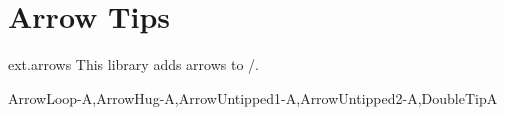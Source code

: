 %
%
%

\section{Arrow Tips}
\label{pgflibrary:arrows}
\tikzset{external/export/.try=false}%
\begin{pgflibrary}{ext.arrows}
  This library adds arrows to \pgfname/\tikzname.
  
              {ArrowLoop-A,ArrowHug-A,ArrowUntipped1-A,ArrowUntipped2-A,DoubleTipA}
\end{pgflibrary}
